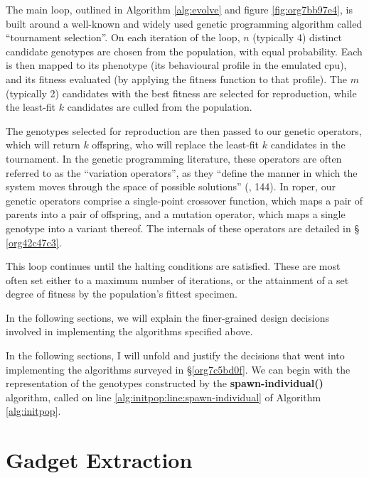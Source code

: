 \documentclass[12pt,glossary]{dalthesis}
\begin{document}
The main loop, outlined in Algorithm \ref{alg:evolve} and figure \ref{fig:org7bb97e4},
is built around a well-known and widely used genetic programming algorithm
called ``tournament selection''. On each iteration of the loop, \(n\) (typically 4)
distinct candidate genotypes are chosen from the population, with equal
probability. Each is then mapped to its phenotype (its behavioural profile in
the emulated \gls{cpu}), and its fitness evaluated (by applying the fitness
function to that profile). The \(m\) (typically 2) candidates with the best
fitness are selected for reproduction, while the least-fit \(k\) candidates are
culled from the population.

The genotypes selected for reproduction are then passed to our genetic
operators, which will return \(k\) offspring, who will replace the least-fit \(k\)
candidates in the tournament. In the genetic programming literature, these
operators are often referred to as the ``variation operators'', as they ``define the
manner in which the system moves through the space of possible solutions''
(\cite{banzhaf98}, 144). In \gls{roper}, our genetic operators comprise a
single-point crossover function, which maps a pair of parents into a pair of
offspring, and a mutation operator, which maps a single genotype into a variant
thereof. The internals of these operators are detailed in \S
\ref{org42c47c3}.

This loop continues until the halting conditions are satisfied. These are most
often set either to a maximum number of iterations, or the attainment of a set
degree of fitness by the population's fittest specimen.

In the following sections, we will explain the finer-grained design decisions
involved in implementing the algorithms specified above. 

In the following sections, I will unfold and justify the decisions that went into
implementing the algorithms surveyed in \S \ref{org7c5bd0f}.
We can begin with the representation of the genotypes constructed by
the \textbf{spawn-individual()} algorithm, called on line
\ref{alg:initpop:line:spawn-individual} of Algorithm \ref{alg:initpop}.

\section{Gadget Extraction}
\label{sec:org5600a01}
\label{orgf6d269c}
\end{document}
